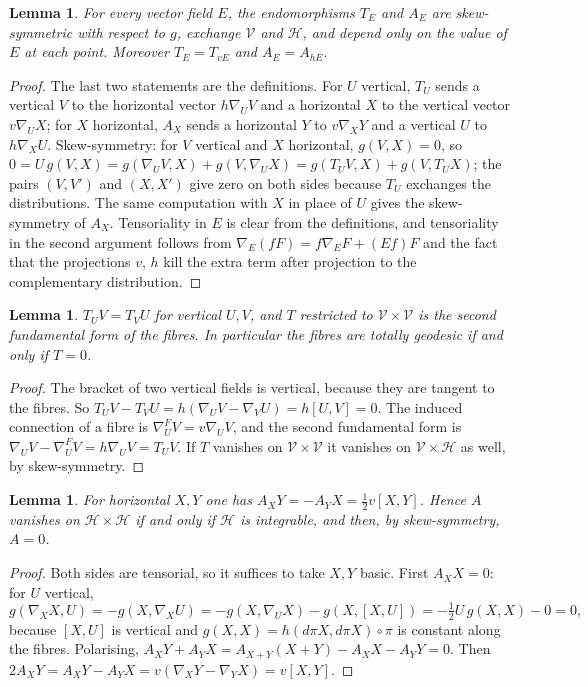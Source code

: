 \documentclass[11pt,reqno]{amsart}
\theoremstyle{plain}
\newtheorem{lemma}[theorem]{Lemma}
\theoremstyle{definition}
\newcommand{\hor}{\mathcal{H}}
\newcommand{\ver}{\mathcal{V}}
\begin{document}
\begin{lemma}\label{lem:appskew}
For every vector field $E$, the endomorphisms $T_E$ and $A_E$ are skew-symmetric with respect to $g$, exchange $\ver$ and $\hor$, and depend only on the value of $E$ at each point. Moreover $T_E=T_{vE}$ and $A_E=A_{hE}$.
\end{lemma}

\begin{proof}
The last two statements are the definitions. For $U$ vertical, $T_U$ sends a vertical $V$ to the horizontal vector $h\nabla_UV$ and a horizontal $X$ to the vertical vector $v\nabla_UX$; for $X$ horizontal, $A_X$ sends a horizontal $Y$ to $v\nabla_XY$ and a vertical $U$ to $h\nabla_XU$. Skew-symmetry: for $V$ vertical and $X$ horizontal, $g(V,X)=0$, so $0=U\,g(V,X)=g(\nabla_UV,X)+g(V,\nabla_UX)=g(T_UV,X)+g(V,T_UX)$; the pairs $(V,V')$ and $(X,X')$ give zero on both sides because $T_U$ exchanges the distributions. The same computation with $X$ in place of $U$ gives the skew-symmetry of $A_X$. Tensoriality in $E$ is clear from the definitions, and tensoriality in the second argument follows from $\nabla_E(fF)=f\nabla_EF+(Ef)F$ and the fact that the projections $v$, $h$ kill the extra term after projection to the complementary distribution.
\end{proof}

\begin{lemma}\label{lem:appT}
$T_UV=T_VU$ for vertical $U,V$, and $T$ restricted to $\ver\times\ver$ is the second fundamental form of the fibres. In particular the fibres are totally geodesic if and only if $T=0$.
\end{lemma}

\begin{proof}
The bracket of two vertical fields is vertical, because they are tangent to the fibres. So $T_UV-T_VU=h(\nabla_UV-\nabla_VU)=h[U,V]=0$. The induced connection of a fibre is $\nabla^F_UV=v\nabla_UV$, and the second fundamental form is $\nabla_UV-\nabla^F_UV=h\nabla_UV=T_UV$. If $T$ vanishes on $\ver\times\ver$ it vanishes on $\ver\times\hor$ as well, by skew-symmetry.
\end{proof}

\begin{lemma}\label{lem:appA}
For horizontal $X,Y$ one has $A_XY=-A_YX=\tfrac12v[X,Y]$. Hence $A$ vanishes on $\hor\times\hor$ if and only if $\hor$ is integrable, and then, by skew-symmetry, $A=0$.
\end{lemma}

\begin{proof}
Both sides are tensorial, so it suffices to take $X,Y$ basic. First $A_XX=0$: for $U$ vertical,
\[
g(\nabla_XX,U)=-g(X,\nabla_XU)=-g(X,\nabla_UX)-g(X,[X,U])=-\tfrac12U\,g(X,X)-0=0,
\]
because $[X,U]$ is vertical and $g(X,X)=h(d\pi X,d\pi X)\circ\pi$ is constant along the fibres. Polarising, $A_XY+A_YX=A_{X+Y}(X+Y)-A_XX-A_YY=0$. Then $2A_XY=A_XY-A_YX=v(\nabla_XY-\nabla_YX)=v[X,Y]$.
\end{proof}
\end{document}

